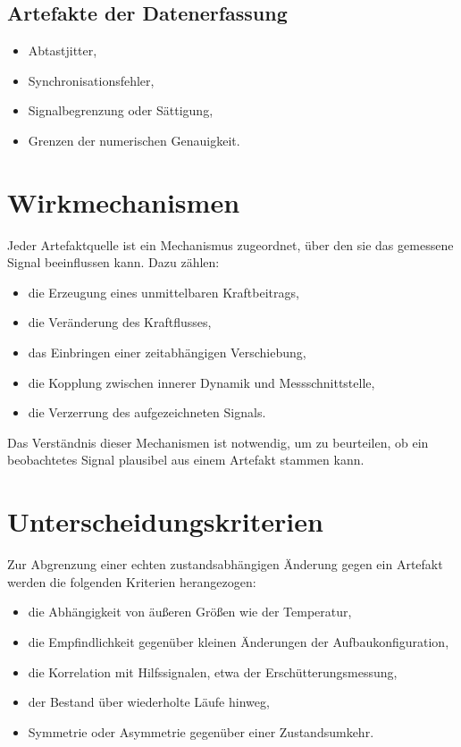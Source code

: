 \documentclass[12pt,a4paper]{report}
\begin{document}
\subsection{Artefakte der Datenerfassung}

\begin{itemize}
\item Abtastjitter,
\item Synchronisationsfehler,
\item Signalbegrenzung oder Sättigung,
\item Grenzen der numerischen Genauigkeit.
\end{itemize}

\section{Wirkmechanismen}

Jeder Artefaktquelle ist ein Mechanismus zugeordnet, über den sie das
gemessene Signal beeinflussen kann. Dazu zählen:

\begin{itemize}
\item die Erzeugung eines unmittelbaren Kraftbeitrags,
\item die Veränderung des Kraftflusses,
\item das Einbringen einer zeitabhängigen Verschiebung,
\item die Kopplung zwischen innerer Dynamik und Messschnittstelle,
\item die Verzerrung des aufgezeichneten Signals.
\end{itemize}

Das Verständnis dieser Mechanismen ist notwendig, um zu beurteilen, ob
ein beobachtetes Signal plausibel aus einem Artefakt stammen kann.

\section{Unterscheidungskriterien}

Zur Abgrenzung einer echten zustandsabhängigen Änderung gegen ein
Artefakt werden die folgenden Kriterien herangezogen:

\begin{itemize}
\item die Abhängigkeit von äußeren Größen wie der Temperatur,
\item die Empfindlichkeit gegenüber kleinen Änderungen der
      Aufbaukonfiguration,
\item die Korrelation mit Hilfssignalen, etwa der Erschütterungsmessung,
\item der Bestand über wiederholte Läufe hinweg,
\item Symmetrie oder Asymmetrie gegenüber einer Zustandsumkehr.
\end{itemize}
\end{document}
